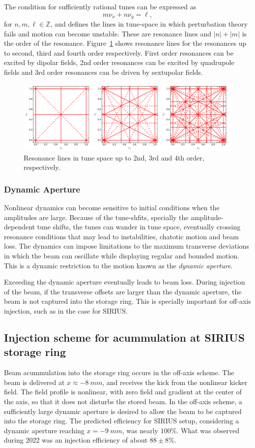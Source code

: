 The condition for sufficiently rational tunes can be expressed as
    $$m\nu_x + n\nu_y = \ell,$$
    for $n, m, \ell\in\mathbb{Z}$, and defines the lines in tune-space in which perturbation theory fails and motion can become unstable. These are resonance lines and $|n|+|m|$ is the order of the resonance. Figure~\ref{resons} shows resonance lines for the resonances up to second, third and fourth order respectively. First order resonances can be excited by dipolar fields, 2nd order resonances can be excited by quadrupole fields and 3rd order resonances can be driven by sextupolar fields.
\begin{figure}[thb]
    \centering
    \includegraphics[width=\textwidth]{Images/tunes.png}
    \caption{Resonance lines in tune space up to 2nd, 3rd and 4th order, respectively.}
    \label{resons}
\end{figure}
\subsubsection{Dynamic Aperture}
    Nonlinear dynamics can become sensitive to initial conditions when the amplitudes are large. Because of the tune-shfits, specially the amplitude-dependent tune shifts, the tunes can wander in tune space, eventually crossing resonance conditions that may lead to instabilities, chatotic motion and beam loss. The dynamics can impose limitations to the maximum transverse deviations in which the beam can oscillate while displaying regular and bounded motion. This is a dynamic restriction to the motion known as the \textit{dynamic aperture}.

    Exceeding the dynamic aperture eventually leads to beam loss. During injection of the beam, if the transverse offsets are larger than the dynamic aperture, the beam is not captured into the storage ring. This is specially important for off-axis injection, such as in the case for SIRIUS.

\subsection{Injection scheme for acummulation at SIRIUS storage ring}
Beam acummulation into the storage ring occurs in the off-axis scheme. The beam is delivered at $x\approx-8~\unit{mm}$, and receives the kick from the nonlinear kicker field. The field profile is nonlinear, with zero field and gradient at the center of the axis, so that it does not disturbs the stored beam.
In the off-axis scheme, a sufficiently large dynamic aperture is desired to allow the beam to be captured into the storage ring. The predicted efficiency for SIRIUS setup, considering a dynamic aperture reaching $x=-9~\unit{mm}$, was nearly $100\%$. What was observed during 2022 was an injection efficiency of about $88\pm8\%$.
\lipsum[1-10]

